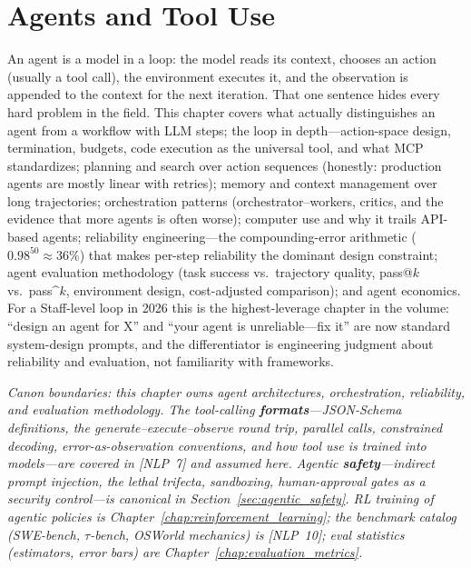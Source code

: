 \chapter{Agents and Tool Use}
\label{chap:agents_tool_use}

\begin{tldr}
An agent is a model in a loop: the model reads its context, chooses an action (usually a tool call), the environment executes it, and the observation is appended to the context for the next iteration. That one sentence hides every hard problem in the field. This chapter covers what actually distinguishes an agent from a workflow with LLM steps; the loop in depth---action-space design, termination, budgets, code execution as the universal tool, and what MCP standardizes; planning and search over action sequences (honestly: production agents are mostly linear with retries); memory and context management over long trajectories; orchestration patterns (orchestrator--workers, critics, and the evidence that more agents is often worse); computer use and why it trails API-based agents; reliability engineering---the compounding-error arithmetic ($0.98^{50} \approx 36\%$) that makes per-step reliability the dominant design constraint; agent evaluation methodology (task success vs.\ trajectory quality, pass@$k$ vs.\ pass\textasciicircum{}$k$, environment design, cost-adjusted comparison); and agent economics. For a Staff-level loop in 2026 this is the highest-leverage chapter in the volume: ``design an agent for X'' and ``your agent is unreliable---fix it'' are now standard system-design prompts, and the differentiator is engineering judgment about reliability and evaluation, not familiarity with frameworks.
\end{tldr}

\textit{Canon boundaries: this chapter owns agent architectures, orchestration, reliability, and evaluation methodology. The tool-calling \textbf{formats}---JSON-Schema definitions, the generate--execute--observe round trip, parallel calls, constrained decoding, error-as-observation conventions, and how tool use is trained into models---are covered in [NLP~7] and assumed here. Agentic \textbf{safety}---indirect prompt injection, the lethal trifecta, sandboxing, human-approval gates as a security control---is canonical in Section~\ref{sec:agentic_safety}. RL training of agentic policies is Chapter~\ref{chap:reinforcement_learning}; the benchmark catalog (SWE-bench, $\tau$-bench, OSWorld mechanics) is [NLP~10]; eval statistics (estimators, error bars) are Chapter~\ref{chap:evaluation_metrics}.}


